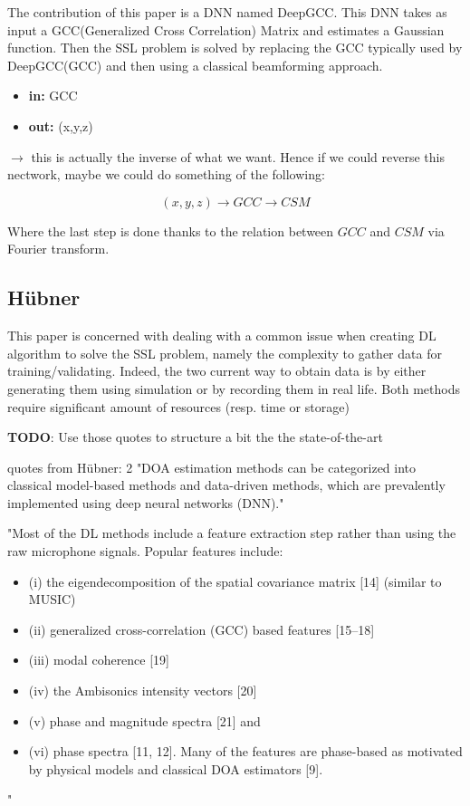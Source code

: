 \documentclass{article}
\begin{document}
The contribution of this paper is a DNN named DeepGCC. This DNN takes as input a GCC(Generalized Cross Correlation) Matrix and estimates a Gaussian function. Then the SSL problem is solved by replacing the GCC typically used by DeepGCC(GCC) and then using a classical beamforming approach. 

\begin{itemize}
    \item \textbf{in:} GCC
    \item \textbf{out:} (x,y,z)
\end{itemize}

$\rightarrow$ this is actually the inverse of what we want. Hence if we could reverse this nectwork, maybe we could do something of the following: 

\begin{equation}
    (x,y,z) \rightarrow GCC \rightarrow CSM
\end{equation}

Where the last step is done thanks to the relation between $GCC$ and $CSM$ via Fourier transform. 


\subsection{Hübner}

This paper is concerned with dealing with a common issue when creating DL algorithm to solve the SSL problem, namely the complexity to gather data for training/validating. Indeed, the two current way to obtain data is by either generating them using simulation or by recording them in real life. Both methods require significant amount of resources (resp. time or storage)

\textbf{TODO}: Use those quotes to structure a bit the the state-of-the-art

quotes from Hübner:
2
"DOA estimation methods can be categorized into classical model-based methods and data-driven methods, which are prevalently implemented using deep neural networks (DNN)."

"Most of the DL methods include a feature extraction step rather than using the raw microphone signals. Popular features include:

\begin{itemize}
    \item (i) the eigendecomposition of the spatial covariance matrix [14] (similar to MUSIC)
    \item (ii) generalized cross-correlation (GCC) based features [15–18]
    \item (iii) modal coherence [19]
    \item (iv) the Ambisonics intensity vectors [20]
    \item (v) phase and magnitude spectra [21] and
    \item (vi) phase spectra [11, 12]. Many of the features are phase-based as motivated by physical models and classical DOA estimators [9].
\end{itemize}
"
\end{document}
